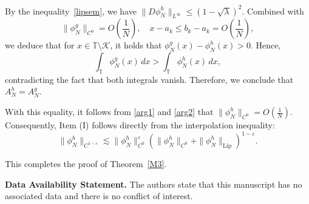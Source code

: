 \documentclass{amsart}
\newcommand{\T}{\mathbb{T}}
\theoremstyle{definition}
\begin{document}
By the inequality~\eqref{lipsem}, we have $\| D\phi_N^h \|_{L^\infty} \leq (1 - \sqrt{\lambda})^2$. Combined with
\[
\| \phi_N^g \|_{C^0} = O\left( \frac{1}{N} \right), \quad x - a_k \leq b_k - a_k = O\left( \frac{1}{N} \right),
\]
we deduce that for $x \in \T \setminus \mathcal{K}$, it holds that $\phi_N^g(x) - \phi_N^h(x) > 0$. Hence,
\[
\int_{\T} \phi_N^g(x) \, dx > \int_{\T} \phi_N^h(x) \, dx,
\]
contradicting the fact that both integrals vanish. Therefore, we conclude that $A_N^h = A_N^g$.

With this equality, it follows from \eqref{arg1} and \eqref{arg2} that $\| \phi_N^h \|_{C^0} = O\left( \frac{1}{N} \right)$. Consequently, Item (I) follows directly from the interpolation inequality:
\[
\| \phi_N^h \|_{C^{1 - \varepsilon}}\lesssim \| \phi_N^h \|_{C^0}^{\varepsilon} \left( \| \phi_N^h \|_{C^0} + \| \phi_N^h \|_{\mathrm{Lip}} \right)^{1 - \varepsilon}.
\]

This completes the proof of Theorem~\ref{M3}.





\vspace{2em}




 \noindent\textbf{Data Availability Statement.}
The authors state that this manuscript has no associated data and there is no conflict of interest.


\medskip
\end{document}
